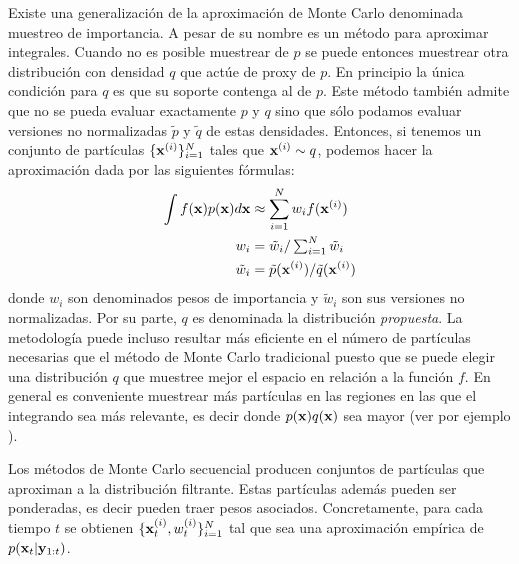 Existe una generalización de la aproximación de Monte Carlo denominada muestreo de importancia. A pesar de su nombre es un método para aproximar integrales. Cuando no es posible muestrear de $p$ se puede entonces muestrear otra distribución con densidad $q$ que actúe de proxy de $p$. En principio la única condición para $q$ es que su soporte contenga al de $p$. Este método también admite que no se pueda evaluar exactamente $p$ y $q$ sino que sólo podamos evaluar versiones no normalizadas $\tilde{p}$ y $\tilde{q}$ de estas densidades. Entonces, si tenemos un conjunto de partículas $\{\mathbf{x}^{(i)}\}_{i=1}^N$ tales que $\mathbf{x}^{(i)}\sim q$, podemos hacer la aproximación dada por las siguientes fórmulas:
\begin{align*}
    \int f(\mathbf{x}) p(\mathbf{x}) d \mathbf{x} &\approx \sum_{i=1}^N w_i f(\mathbf{x}^{(i)}) \\
    w_i &= \tilde{w}_i / \textstyle\sum_{i=1}^N \tilde{w}_i \\
    \tilde{w}_i &= \tilde{p}(\mathbf{x}^{(i)}) / \tilde{q}(\mathbf{x}^{(i)})
\end{align*}
donde $w_i$ son denominados pesos de importancia y $\tilde{w}_i$ son sus versiones no normalizadas. Por su parte, $q$ es denominada la distribución \textit{propuesta}. La metodología puede incluso resultar más eficiente en el número de partículas necesarias que el método de Monte Carlo tradicional puesto que se puede elegir una distribución $q$ que muestree mejor el espacio en relación a la función $f$. En general es conveniente muestrear más partículas en las regiones en las que el integrando sea más relevante, es decir donde $p(\mathbf{x}) q(\mathbf{x})$ sea mayor (ver por ejemplo \cite{Murphy2012,Mackay2003}).

Los métodos de Monte Carlo secuencial producen conjuntos de partículas que aproximan a la distribución filtrante. Estas partículas además pueden ser ponderadas, es decir pueden traer pesos asociados. Concretamente, para cada tiempo $t$ se obtienen $\{\mathbf{x}_t^{(i)}, w_t^{(i)}\}_{i=1}^{N}$ tal que sea una aproximación empírica de $p(\mathbf{x}_t | \mathbf{y}_{1:t})$.


